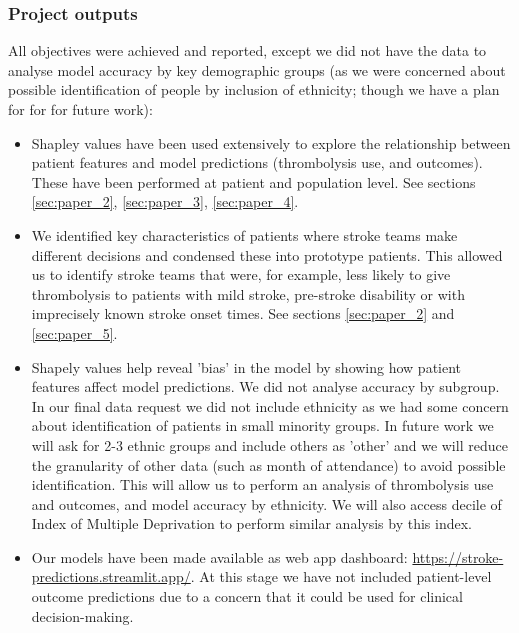 \subsubsection{Project outputs}

All objectives were achieved and reported, except we did not have the data to analyse model accuracy by key demographic groups (as we were concerned about possible identification of people by inclusion of ethnicity; though we have a plan for for for future work):

\begin{itemize}
    \item Shapley values have been used extensively to explore the relationship between patient features and model predictions (thrombolysis use, and outcomes). These have been performed at patient and population level. See sections \ref{sec:paper_2}, \ref{sec:paper_3}, \ref{sec:paper_4}.
    \item We identified key characteristics of patients where stroke teams make different decisions and condensed these into prototype patients. This allowed us to identify stroke teams that were, for example, less likely to give thrombolysis to patients with mild stroke, pre-stroke disability or with imprecisely known stroke onset times. See sections \ref{sec:paper_2} and \ref{sec:paper_5}.
    \item Shapely values help reveal 'bias' in the model by showing how patient features affect model predictions. We did not analyse accuracy by subgroup. In our final data request we did not include ethnicity as we had some concern about identification of patients in small minority groups. In future work we will ask for 2-3 ethnic groups and include others as 'other' and we will reduce the granularity of other data (such as month of attendance) to avoid possible identification. This will allow us to perform an analysis of thrombolysis use and outcomes, and model accuracy by ethnicity. We will also access decile of Index of Multiple Deprivation to perform similar analysis by this index.
    \item Our models have been made available as web app dashboard: \url{https://stroke-predictions.streamlit.app/}. At this stage we have not included patient-level outcome predictions due to a concern that it could be used for clinical decision-making. 
\end{itemize}




